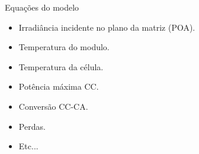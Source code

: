 \documentclass{beamer}
\begin{document}
\begin{frame}{Equações do modelo}

\begin{itemize}
  \item Irradiância incidente no plano da matriz (POA).
  
  \item Temperatura do modulo.

  \item Temperatura da célula.
  
  \item Potência máxima CC.
  
   \item Conversão CC-CA.
   
   \item Perdas.
   
   \item Etc...
\end{itemize}

\end{frame}

\end{document}
